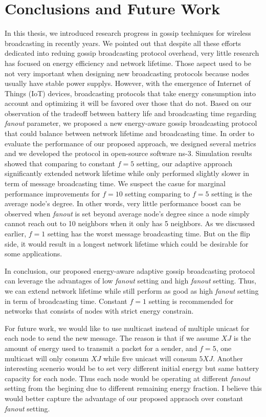 \chapter{Conclusions and Future Work}
\label{Chapter6}

In this thesis, we introduced research progress in gossip techniques for wireless broadcasting in recently years. We pointed out that despite all these efforts dedicated into reduing gossip broadcasting protocol overhead, very little research has focused on energy efficiency and network lifetime. Those aspect used to be not very important when designing new broadcasting protocols because nodes usually have stable power supplys. However, with the emergence of Internet of Things (IoT) devices, broadcasting protocols that take energy consumption  into account and optimizing it will be favored over those that do not. Based on our observation of the tradeoff between battery life and broadcasting time regarding \emph{fanout} parameter, we proposed a new energy-aware gossip broadcasting protocol that could balance between network lifetime and broadcasting time. In order to evaluate the performance of our proposed approach, we designed several metrics and we developed the protocol in open-source software ns-3. Simulation results showed that comparing to constant $f=5$ setting, our adaptive approach significantly extended network lifetime while only performed slightly slower in term of message broadcasting time. We suspect the casue for marginal performance improvements for $f=10$ setting comparing to $f=5$ setting is the average node's degree. In other words, very little performance boost can be observed when \emph{fanout} is set beyond average node's degree since a node simply cannot reach out to 10 neighbors when it only has 5 neighbors. As we discussed earlier, $f=1$ setting has the worst message broadcasting time. But on the flip side, it would result in a longest network lifetime which could be desirable for some applications. 

In conclusion, our proposed energy-aware adaptive gossip broadcasting protocol can leverage the advantages of low \emph{fanout} setting and high \emph{fanout} setting. Thus, we can extend network lifetime while still perform as good as high \emph{fanout} setting in term of broadcasting time. Constant $f=1$ setting is recommended for networks that consists of nodes with strict energy constrain. 

For future work, we would like to use multicast instead of multiple unicast for each node to send the new message. The reason is that if we assume $X J$ is the amount of energy used to transmit a packet for a sender, and $f=5$, one multicast will only consum $X J$ while five unicast will consum $5X J$. Another interesting scenerio would be to set very different initial energy but same battery capacity for each node. Thus each node would be operating at different \emph{fanout} setting from the begining due to different remaining energy fraction. I believe this would better capture the advantage of our proposed appraoch over constant \emph{fanout} setting.